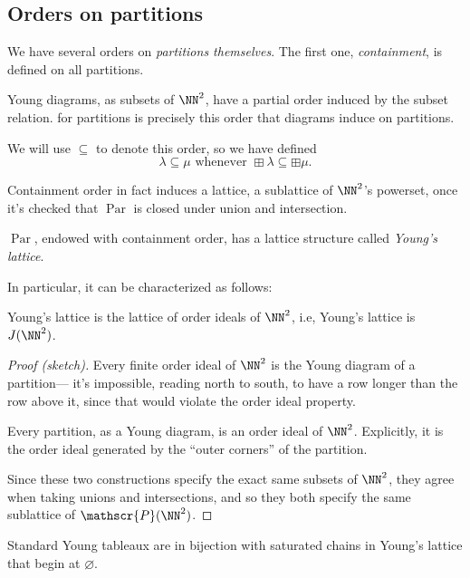 \documentclass{article}
\DeclareMathOperator{\Par}{Par}
\begin{document}
\subsection{Orders on partitions}

We have several orders on \textit{partitions themselves}.
The first one, \textit{containment}, is defined on all partitions.

\begin{definition}
    Young diagrams, as subsets of $\NN^2$, have a partial order induced by the subset relation. 
     for partitions is precisely this order that diagrams induce on partitions.

    We will use $\subseteq$ to denote this order, so we have defined
    \[
        \lambda \subseteq \mu \text{ whenever } \boxplus \lambda \subseteq \boxplus \mu.
    \]
\end{definition}

Containment order in fact induces a lattice, a sublattice of $\NN^2$'s powerset, once it's checked that $\Par$ is closed under union and intersection. 

\begin{remark}
    $\Par$, endowed with containment order, has a lattice structure called \textit{Young's lattice}.
\end{remark}

In particular, it can be characterized as follows:

\begin{theorem}
    Young's lattice is the lattice of order ideals of $\NN^2$, i.e, Young's lattice is $J(\NN^2)$.
\end{theorem}

\begin{proof}[Proof (sketch)]
    Every finite order ideal of $\NN^2$ is the Young diagram of a partition--- it's impossible, reading north to south, to have a row longer than the row above it, since that would violate the order ideal property.

    Every partition, as a Young diagram, is an order ideal of $\NN^2$.
    Explicitly, it is the order ideal generated by the ``outer corners'' of the partition.

    Since these two constructions specify the exact same subsets of $\NN^2$, they agree when taking unions and intersections, and so they both specify the same sublattice of $\mathscr{P}(\NN^2)$.
\end{proof}

\begin{theorem}
    Standard Young tableaux are in bijection with saturated chains in Young's lattice that begin at $\varnothing$.
\end{theorem}
\end{document}
